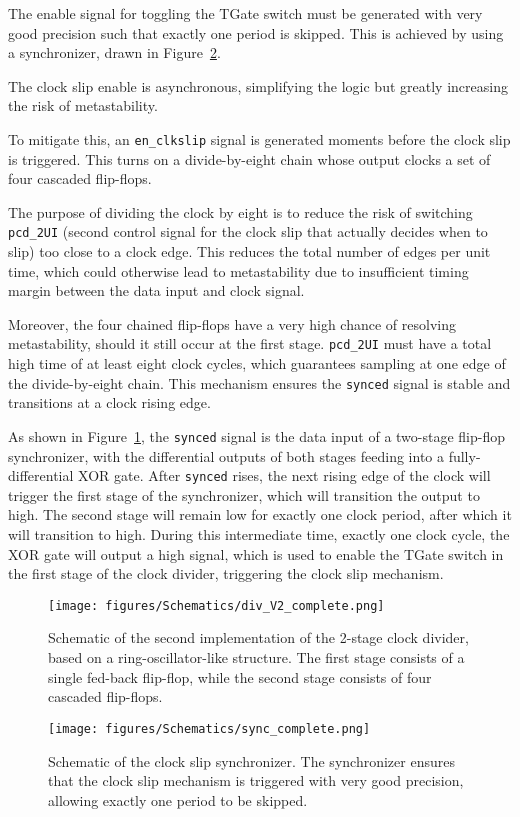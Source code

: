 The enable signal for toggling the TGate switch must be generated with very good precision such that exactly one period is skipped. This is achieved by using a synchronizer, drawn in Figure~\ref{fig:sync}.

The clock slip enable is asynchronous, simplifying the logic but greatly increasing the risk of metastability. 

To mitigate this, an \texttt{en\_clkslip} signal is generated moments before the clock slip is triggered. This turns on a divide-by-eight chain whose output clocks a set of four cascaded flip-flops. 

The purpose of dividing the clock by eight is to reduce the risk of switching \texttt{pcd\_2UI} (second control signal for the clock slip that actually decides when to slip) too close to a clock edge. This reduces the total number of edges per unit time, which could otherwise lead to metastability due to insufficient timing margin between the data input and clock signal. 

Moreover, the four chained flip-flops have a very high chance of resolving metastability, should it still occur at the first stage. \texttt{pcd\_2UI} must have a total high time of at least eight clock cycles, which guarantees sampling at one edge of the divide-by-eight chain.
This mechanism ensures the \texttt{synced} signal is stable and transitions at a clock rising edge.

As shown in Figure~\ref{fig:div_V2_complete}, the \texttt{synced} signal is the data input of a two-stage flip-flop synchronizer, with the differential outputs of both stages feeding into a fully-differential XOR gate.
After \texttt{synced} rises, the next rising edge of the clock will trigger the first stage of the synchronizer, which will transition the output to high. The second stage will remain low for exactly one clock period, after which it will transition to high. During this intermediate time, exactly one clock cycle, the XOR gate will output a high signal, which is used to enable the TGate switch in the first stage of the clock divider, triggering the clock slip mechanism.

\begin{figure}[H]
  \centering
  \texttt{[image: figures/Schematics/div\_V2\_complete.png]}
  \caption{Schematic of the second implementation of the 2-stage clock divider, based on a ring-oscillator-like structure. The first stage consists of a single fed-back flip-flop, while the second stage consists of four cascaded flip-flops.}
  \label{fig:div_V2_complete}
\end{figure}
\begin{figure}[H]
  \centering
  \texttt{[image: figures/Schematics/sync\_complete.png]}
  \caption{Schematic of the clock slip synchronizer. The synchronizer ensures that the clock slip mechanism is triggered with very good precision, allowing exactly one period to be skipped.}
  \label{fig:sync}
\end{figure}

